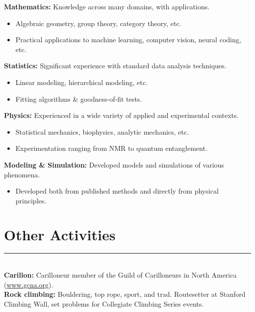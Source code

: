 \documentclass[margin]{res}
\begin{document}
\begin{resume}
\begin{itemize}
\end{itemize}\vspace{-8pt}
{\bf Mathematics:} Knowledge across many domains, with applications.
\begin{itemize} \itemsep -2pt
\item Algebraic geometry, group theory, category theory, etc. \item Practical applications to machine learning, computer vision, neural coding, etc. \end{itemize}\vspace{-8pt}
{\bf Statistics:} Significant experience with standard data analysis techniques.
\begin{itemize} \itemsep -2pt
  \item Linear modeling, hierarchical modeling, etc.
  \item Fitting algorithms \& goodness-of-fit tests. \end{itemize} \vspace{-8pt}
{\bf Physics:} Experienced in a wide variety of applied and experimental contexts.\begin{itemize} \itemsep -2pt
\item Statistical mechanics, biophysics, analytic mechanics, etc. \item Experimentation ranging from NMR to quantum entanglement. \end{itemize}\vspace{-8pt}
{\bf Modeling \& Simulation:} Developed models and simulations of various phenomena. 
\begin{itemize} \itemsep -2pt
  \item Developed both from published methods and directly from physical principles. \end{itemize}
\vspace{1pt}\section{Other Activities} \vspace{-15pt} \rule{\textwidth}{0.5pt} \\[3pt]
{\bf Carillon:} Carilloneur member of the Guild of Carilloneurs in North America (\url{www.gcna.org}). \\[3pt]
{\bf Rock climbing:} Bouldering, top rope, sport, and trad. Routesetter at Stanford Climbing Wall, set problems for Collegiate Climbing Series events.

\end{resume}
\end{document}
